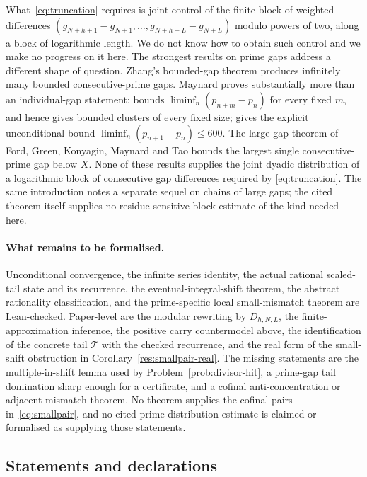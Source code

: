 \documentclass[11pt]{article}
\begin{document}
What~\eqref{eq:truncation} requires is joint control of the finite block of
weighted differences $(g_{N+h+1}-g_{N+1},\ldots,g_{N+h+L}-g_{N+L})$ modulo
powers of two, along a block of logarithmic length.  We do not know how to obtain such control and
we make no progress on it here.  The strongest results on prime gaps address a
different shape of question.  Zhang's bounded-gap theorem
\cite[Theorem~1, p.~1122]{zhang2014} produces infinitely many bounded
consecutive-prime gaps.
Maynard proves substantially more than an individual-gap statement:
\cite[Theorem~1.1, p.~384]{maynard2015} bounds
$\liminf_n(p_{n+m}-p_n)$ for every fixed $m$, and hence gives bounded clusters
of every fixed size; \cite[Theorem~1.3, p.~385]{maynard2015} gives the explicit
unconditional bound $\liminf_n(p_{n+1}-p_n)\le 600$.  The large-gap theorem of
Ford, Green, Konyagin, Maynard and Tao
\cite[Theorem~1, p.~66]{fgkmt2018} bounds the largest single consecutive-prime
gap below $X$.  None of these results supplies the joint dyadic distribution
of a logarithmic block of consecutive gap differences required by
\eqref{eq:truncation}.  The same introduction notes a separate sequel on
chains of large gaps; the cited theorem itself supplies no residue-sensitive
block estimate of the kind needed here.

\paragraph{What remains to be formalised.}
Unconditional convergence, the infinite series identity, the actual rational
scaled-tail state and its recurrence, the eventual-integral-shift theorem, the
abstract rationality classification, and the prime-specific local
small-mismatch theorem are Lean-checked.  Paper-level are the modular
rewriting by $D_{h,N,L}$, the finite-approximation inference, the positive
carry countermodel above, the identification of the concrete tail
$\mathcal T$ with the checked recurrence, and the real form of the small-shift
obstruction in Corollary~\ref{res:smallpair-real}.
The missing statements are the multiple-in-shift lemma used by
Problem~\ref{prob:divisor-hit}, a prime-gap tail domination sharp enough for a
certificate, and a cofinal anti-concentration or adjacent-mismatch theorem.
No theorem supplies the cofinal pairs in~\eqref{eq:smallpair}, and no cited
prime-distribution estimate is claimed or formalised as supplying those
statements.

\subsection*{Statements and declarations}
\end{document}
